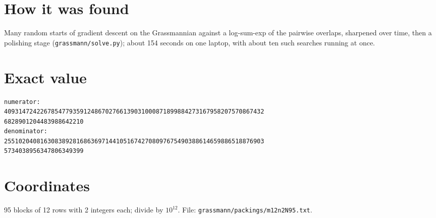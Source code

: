 \documentclass[11pt,a4paper]{article}
\begin{document}
\section{How it was found}
Many random starts of gradient descent on the Grassmannian against a log-sum-exp of the pairwise overlaps, sharpened over time, then a polishing stage (\texttt{grassmann/solve.py}); about 154 seconds on one laptop, with about ten such searches running at once.


\appendix
\section{Exact value}
{\small
\begin{verbatim}
numerator:
409314724226785477935912486702766139031000871899884273167958207570867432
6828901204483988642210
denominator:
255102040816308389281686369714410516742708097675490388614659886518876903
5734038956347806349399
\end{verbatim}}

\section{Coordinates}
95 blocks of 12 rows with 2 integers each; divide by $10^{12}$. File: \texttt{grassmann/packings/m12n2N95.txt}.
{\tiny
\begin{multicols}{4}
\end{multicols}}
\end{document}
